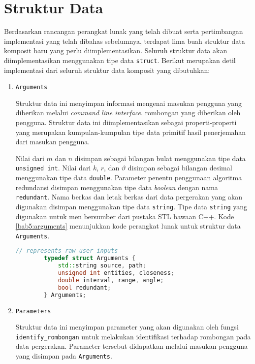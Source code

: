 \section{Struktur Data}
\label{sec:impl-struct}

Berdasarkan rancangan perangkat lunak yang telah dibuat serta pertimbangan implementasi yang telah dibahas sebelumnya, terdapat lima buah struktur data komposit baru yang perlu diimplementasikan. Seluruh struktur data akan diimplementasikan menggunakan tipe data \texttt{struct}. Berikut merupakan detil implementasi dari seluruh struktur data komposit yang dibutuhkan:

\begin{enumerate}
    \item \texttt{Arguments}
    
    Struktur data ini menyimpan informasi mengenai masukan pengguna yang diberikan melalui \textit{command line interface}. rombongan yang diberikan oleh pengguna. Struktur data ini diimplementasikan sebagai properti-properti yang merupakan kumpulan-kumpulan tipe data primitif hasil penerjemahan dari masukan pengguna.
    
    Nilai dari $m$ dan $n$ disimpan sebagai bilangan bulat menggunakan tipe data \texttt{unsigned int}. Nilai dari $k$, $r$, dan $\vartheta$ disimpan sebagai bilangan desimal menggunakan tipe data \texttt{double}. Parameter penentu penggunaan algoritma redundansi disimpan menggunakan tipe data \textit{boolean} dengan nama \texttt{redundant}. Nama berkas dan letak berkas dari data pergerakan yang akan digunakan disimpan menggunakan tipe data \texttt{string}. Tipe data \texttt{string} yang digunakan untuk men bersumber dari pustaka STL bawaan C++. Kode \ref{bab5:arguments} menunjukkan kode perangkat lunak untuk struktur data \texttt{Arguments}. 
    
    \begin{lstlisting}[language=C++, caption=Implementasi \texttt{Arguments}, label={bab5:arguments}]
        // represents raw user inputs
        typedef struct Arguments {
            std::string source, path;
            unsigned int entities, closeness;
            double interval, range, angle;
            bool redundant;
        } Arguments;
    \end{lstlisting}
    
    \item \texttt{Parameters}
    
    Struktur data ini menyimpan parameter yang akan digunakan oleh fungsi \texttt{identify\_rombongan} untuk melakukan identifikasi terhadap rombongan pada data pergerakan. Parameter tersebut didapatkan melalui masukan pengguna yang disimpan pada \texttt{Arguments}.
    

\end{enumerate}
